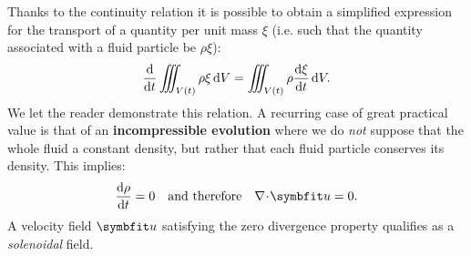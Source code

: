  Thanks to the continuity relation it is possible to obtain a simplified expression for the transport of a quantity per unit mass $\xi$ (i.e. such that the quantity associated with a fluid particle be $\rho\xi$):
\begin{equation}
\frac{\mathrm d }{\mathrm d t} \iiint_{V(t)} \rho \xi\, \mathrm dV = \iiint_{V(t)} \rho \frac{\mathrm d \xi}{\mathrm d t} \,\mathrm dV.
\end{equation}
We let the reader demonstrate this relation.
A recurring case of great practical value is that of an \textbf{incompressible evolution} where we do \textit{not} suppose that the whole fluid a constant density, but rather that each fluid particle conserves its density. This implies:
\begin{equation}
\dd{\rho}{t} = 0 \quad\text{and therefore}\quad \nabla\!\cdot\!\bu=0.
\end{equation}
A velocity field  $\bu$ satisfying the zero divergence property qualifies as a \textit{solenoidal} field.
